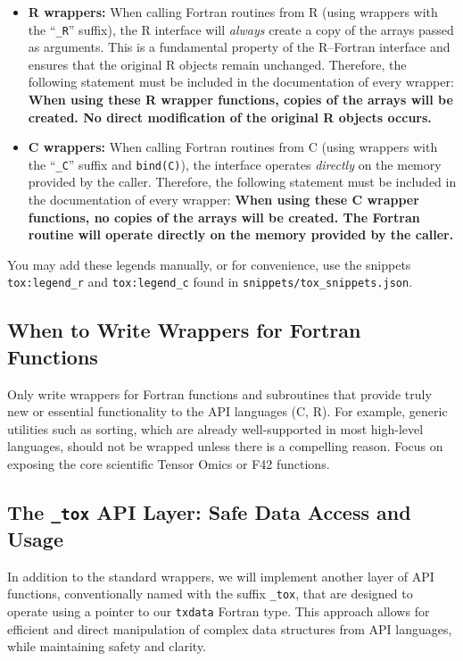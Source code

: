 \documentclass{article}
\begin{document}
\begin{itemize}
  \item \textbf{R wrappers:} When calling Fortran routines from R (using wrappers with the ``\texttt{\_R}'' suffix), the R interface will \emph{always} create a copy of the arrays passed as arguments. This is a fundamental property of the R--Fortran interface and ensures that the original R objects remain unchanged. Therefore, the following statement must be included in the documentation of every wrapper:
  \textbf{When using these R wrapper functions, copies of the arrays will be created. No direct modification of the original R objects occurs.}
  \item \textbf{C wrappers:} When calling Fortran routines from C (using wrappers with the ``\texttt{\_C}'' suffix and \texttt{bind(C)}), the interface operates \emph{directly} on the memory provided by the caller. Therefore, the following statement must be included in the documentation of every wrapper:
  \textbf{When using these C wrapper functions, no copies of the arrays will be created. The Fortran routine will operate directly on the memory provided by the caller.}
\end{itemize}

You may add these legends manually, or for convenience, use the snippets \verb|tox:legend_r| and \verb|tox:legend_c| found in \verb|snippets/tox_snippets.json|.


\subsection{When to Write Wrappers for Fortran Functions}

Only write wrappers for Fortran functions and subroutines that provide truly new or essential functionality to the API languages (C, R). For example, generic utilities such as sorting, which are already well-supported in most high-level languages, should not be wrapped unless there is a compelling reason. Focus on exposing the core scientific Tensor Omics or F42 functions.

\subsection{The \texttt{\_tox} API Layer: Safe Data Access and Usage}

In addition to the standard wrappers, we will implement another layer of API functions, conventionally named with the suffix \texttt{\_tox}, that are designed to operate using a pointer to our \texttt{txdata} Fortran type. This approach allows for efficient and direct manipulation of complex data structures from API languages, while maintaining safety and clarity.
\end{document}

